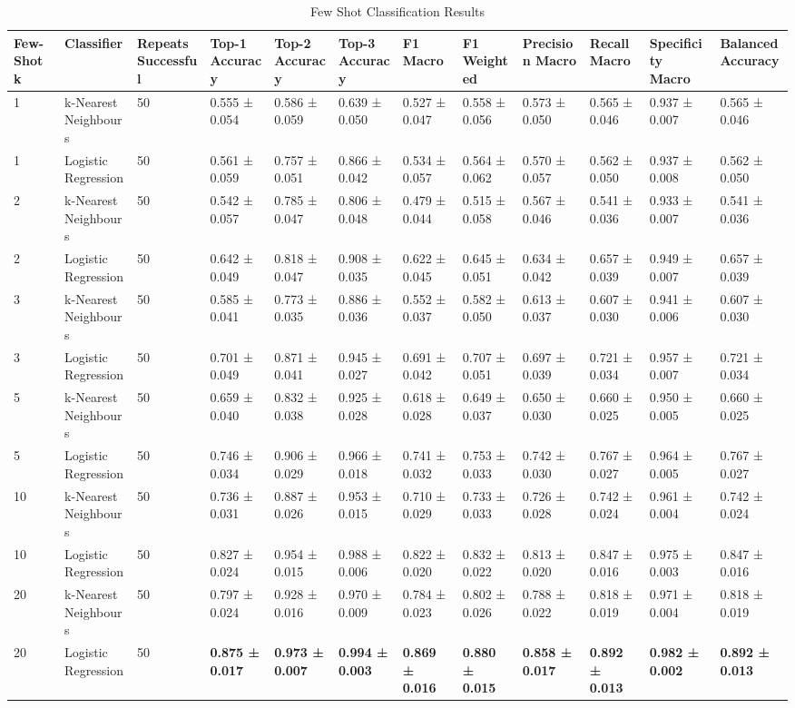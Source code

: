 
\begin{table}[ht]
\centering
\tiny  %
\caption{Few Shot Classification Results}
\label{tab:few_shotclassification_results}
\begin{tabularx}{\textwidth}{lXXXXXXXXXXX}
\toprule
Few-Shot k & Classifier & Repeats Successful & Top-1 Accuracy & Top-2 Accuracy & Top-3 Accuracy & F1 Macro & F1 Weighted & Precision Macro & Recall Macro & Specificity Macro & Balanced Accuracy \\
\midrule
1 & k-Nearest Neighbours & 50 & 0.555 ± 0.054 & 0.586 ± 0.059 & 0.639 ± 0.050 & 0.527 ± 0.047 & 0.558 ± 0.056 & 0.573 ± 0.050 & 0.565 ± 0.046 & 0.937 ± 0.007 & 0.565 ± 0.046 \\
1 & Logistic Regression & 50 & 0.561 ± 0.059 & 0.757 ± 0.051 & 0.866 ± 0.042 & 0.534 ± 0.057 & 0.564 ± 0.062 & 0.570 ± 0.057 & 0.562 ± 0.050 & 0.937 ± 0.008 & 0.562 ± 0.050 \\
2 & k-Nearest Neighbours & 50 & 0.542 ± 0.057 & 0.785 ± 0.047 & 0.806 ± 0.048 & 0.479 ± 0.044 & 0.515 ± 0.058 & 0.567 ± 0.046 & 0.541 ± 0.036 & 0.933 ± 0.007 & 0.541 ± 0.036 \\
2 & Logistic Regression & 50 & 0.642 ± 0.049 & 0.818 ± 0.047 & 0.908 ± 0.035 & 0.622 ± 0.045 & 0.645 ± 0.051 & 0.634 ± 0.042 & 0.657 ± 0.039 & 0.949 ± 0.007 & 0.657 ± 0.039 \\
3 & k-Nearest Neighbours & 50 & 0.585 ± 0.041 & 0.773 ± 0.035 & 0.886 ± 0.036 & 0.552 ± 0.037 & 0.582 ± 0.050 & 0.613 ± 0.037 & 0.607 ± 0.030 & 0.941 ± 0.006 & 0.607 ± 0.030 \\
3 & Logistic Regression & 50 & 0.701 ± 0.049 & 0.871 ± 0.041 & 0.945 ± 0.027 & 0.691 ± 0.042 & 0.707 ± 0.051 & 0.697 ± 0.039 & 0.721 ± 0.034 & 0.957 ± 0.007 & 0.721 ± 0.034 \\
5 & k-Nearest Neighbours & 50 & 0.659 ± 0.040 & 0.832 ± 0.038 & 0.925 ± 0.028 & 0.618 ± 0.028 & 0.649 ± 0.037 & 0.650 ± 0.030 & 0.660 ± 0.025 & 0.950 ± 0.005 & 0.660 ± 0.025 \\
5 & Logistic Regression & 50 & 0.746 ± 0.034 & 0.906 ± 0.029 & 0.966 ± 0.018 & 0.741 ± 0.032 & 0.753 ± 0.033 & 0.742 ± 0.030 & 0.767 ± 0.027 & 0.964 ± 0.005 & 0.767 ± 0.027 \\
10 & k-Nearest Neighbours & 50 & 0.736 ± 0.031 & 0.887 ± 0.026 & 0.953 ± 0.015 & 0.710 ± 0.029 & 0.733 ± 0.033 & 0.726 ± 0.028 & 0.742 ± 0.024 & 0.961 ± 0.004 & 0.742 ± 0.024 \\
10 & Logistic Regression & 50 & 0.827 ± 0.024 & 0.954 ± 0.015 & 0.988 ± 0.006 & 0.822 ± 0.020 & 0.832 ± 0.022 & 0.813 ± 0.020 & 0.847 ± 0.016 & 0.975 ± 0.003 & 0.847 ± 0.016 \\
20 & k-Nearest Neighbours & 50 & 0.797 ± 0.024 & 0.928 ± 0.016 & 0.970 ± 0.009 & 0.784 ± 0.023 & 0.802 ± 0.026 & 0.788 ± 0.022 & 0.818 ± 0.019 & 0.971 ± 0.004 & 0.818 ± 0.019 \\
20 & Logistic Regression & 50 & \textbf{0.875 ± 0.017} & \textbf{0.973 ± 0.007} & \textbf{0.994 ± 0.003} & \textbf{0.869 ± 0.016} & \textbf{0.880 ± 0.015} & \textbf{0.858 ± 0.017} & \textbf{0.892 ± 0.013} & \textbf{0.982 ± 0.002} & \textbf{0.892 ± 0.013} \\
\bottomrule
\bottomrule
\end{tabularx}
\end{table}
